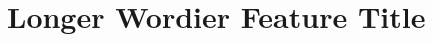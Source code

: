 \renewcommand{\cppxx}{C++14}

\newpage
{}
\section[Short Title\hspace*{1em}(Long Title)]{Longer Wordier Feature Title}\label{Feature}
\label{testmaterial}



%
%
%
%
%
%
%
%
%



